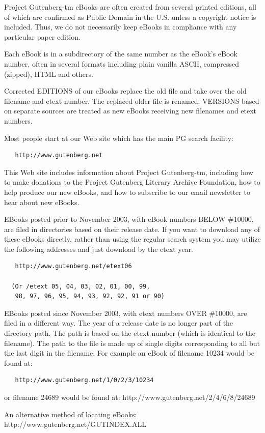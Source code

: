 \documentclass[12pt,oneside]{scrbook}
\begin{document}
  Project Gutenberg-tm eBooks are often created from several printed
  editions, all of which are confirmed as Public Domain in the U.S. unless
  a copyright notice is included. Thus, we do not necessarily keep eBooks
  in compliance with any particular paper edition.
  
  Each eBook is in a subdirectory of the same number as the eBook's eBook
  number, often in several formats including plain vanilla ASCII,
  compressed (zipped), HTML and others.
  
  Corrected EDITIONS of our eBooks replace the old file and take over the
  old filename and etext number. The replaced older file is renamed.
  VERSIONS based on separate sources are treated as new eBooks receiving
  new filenames and etext numbers.
  
  Most people start at our Web site which has the main PG search facility:
  
  \begin{verbatim}
   http://www.gutenberg.net
  \end{verbatim}
  
  This Web site includes information about Project Gutenberg-tm, including
  how to make donations to the Project Gutenberg Literary Archive
  Foundation, how to help produce our new eBooks, and how to subscribe to
  our email newsletter to hear about new eBooks.
  
  EBooks posted prior to November 2003, with eBook numbers BELOW \#10000,
  are filed in directories based on their release date. If you want to
  download any of these eBooks directly, rather than using the regular
  search system you may utilize the following addresses and just download
  by the etext year.
  
  \begin{verbatim}
   http://www.gutenberg.net/etext06
  
  (Or /etext 05, 04, 03, 02, 01, 00, 99,
   98, 97, 96, 95, 94, 93, 92, 92, 91 or 90)
  \end{verbatim}
  
  EBooks posted since November 2003, with etext numbers OVER \#10000, are
  filed in a different way. The year of a release date is no longer part
  of the directory path. The path is based on the etext number (which is
  identical to the filename). The path to the file is made up of single
  digits corresponding to all but the last digit in the filename. For
  example an eBook of filename 10234 would be found at:
  
  \begin{verbatim}
   http://www.gutenberg.net/1/0/2/3/10234
  \end{verbatim}
  
  or filename 24689 would be found at:
  http://www.gutenberg.net/2/4/6/8/24689
  
  An alternative method of locating eBooks:
  http://www.gutenberg.net/GUTINDEX.ALL
  
\end{document}
